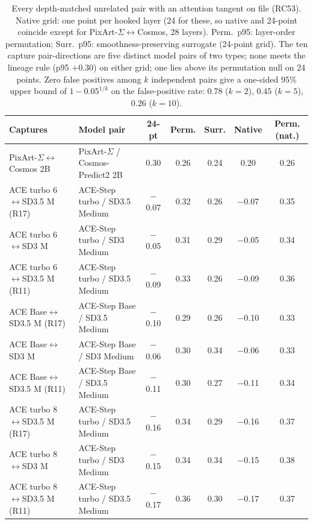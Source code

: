 \begin{table}[htbp]
\centering\scriptsize
\caption{Every depth-matched unrelated pair with an attention tangent on file (RC53). Native grid: one point per hooked layer (24 for these, so native and 24-point coincide except for PixArt-$\Sigma$$\leftrightarrow$Cosmos, 28 layers). Perm.\ p95: layer-order permutation; Surr.\ p95: smoothness-preserving surrogate (24-point grid). The ten capture pair-directions are five distinct model pairs of two types; none meets the lineage rule (p95 $+0.30$) on either grid; one lies above its permutation null on 24 points. Zero false positives among $k$ independent pairs give a one-sided 95\% upper bound of $1-0.05^{1/k}$ on the false-positive rate: $0.78$ ($k=2$), $0.45$ ($k=5$), $0.26$ ($k=10$).}
\label{tab:unrelinv}
\setlength\tabcolsep{2.5pt}
\begin{tabularx}{\linewidth}{@{}lLccccc@{}}
\toprule
Captures & Model pair & 24-pt & Perm. & Surr. & Native & Perm. (nat.)\\
\midrule
PixArt-$\Sigma$$\leftrightarrow$Cosmos 2B & PixArt-$\Sigma$ / Cosmos-Predict2 2B & 0.30 & 0.26 & 0.24 & 0.20 & 0.26\\
ACE turbo 6$\leftrightarrow$SD3.5 M (R17) & ACE-Step turbo / SD3.5 Medium & $-$0.07 & 0.32 & 0.26 & $-$0.07 & 0.35\\
ACE turbo 6$\leftrightarrow$SD3 M & ACE-Step turbo / SD3 Medium & $-$0.05 & 0.31 & 0.29 & $-$0.05 & 0.34\\
ACE turbo 6$\leftrightarrow$SD3.5 M (R11) & ACE-Step turbo / SD3.5 Medium & $-$0.09 & 0.33 & 0.26 & $-$0.09 & 0.36\\
ACE Base$\leftrightarrow$SD3.5 M (R17) & ACE-Step Base / SD3.5 Medium & $-$0.10 & 0.29 & 0.26 & $-$0.10 & 0.33\\
ACE Base$\leftrightarrow$SD3 M & ACE-Step Base / SD3 Medium & $-$0.06 & 0.30 & 0.34 & $-$0.06 & 0.33\\
ACE Base$\leftrightarrow$SD3.5 M (R11) & ACE-Step Base / SD3.5 Medium & $-$0.11 & 0.30 & 0.27 & $-$0.11 & 0.34\\
ACE turbo 8$\leftrightarrow$SD3.5 M (R17) & ACE-Step turbo / SD3.5 Medium & $-$0.16 & 0.34 & 0.29 & $-$0.16 & 0.37\\
ACE turbo 8$\leftrightarrow$SD3 M & ACE-Step turbo / SD3 Medium & $-$0.15 & 0.34 & 0.34 & $-$0.15 & 0.38\\
ACE turbo 8$\leftrightarrow$SD3.5 M (R11) & ACE-Step turbo / SD3.5 Medium & $-$0.17 & 0.36 & 0.30 & $-$0.17 & 0.37\\
\bottomrule
\end{tabularx}
\end{table}

